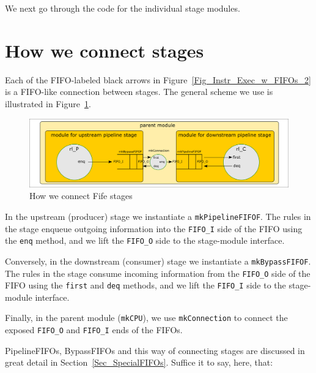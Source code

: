 We next go through the code for the individual stage modules.


\section{How we connect stages}

\label{Sec_Fife_connections}

Each of the FIFO-labeled black arrows in
Figure~\ref{Fig_Instr_Exec_w_FIFOs_2} is a FIFO-like connection
between stages.  The general scheme we use is illustrated in
Figure~\ref{Fig_Fife_connections}.
\begin{figure}[htbp]
  \centerline{\includegraphics[width=6in,angle=0]{Figures/Fig_Composed_FIFO_modularity}}
  \caption{\label{Fig_Fife_connections}
           How we connect Fife stages}
\end{figure}

In the upstream (producer) stage we instantiate a
\verb|mkPipelineFIFOF|.  The rules in the stage enqueue outgoing
information into the \verb|FIFO_I| side of the FIFO using the
\verb|enq| method, and we lift the \verb|FIFO_O| side to the
stage-module interface.

Conversely, in the downstream (consumer) stage we instantiate a
\verb|mkBypassFIFOF|.  The rules in the stage consume incoming
information from the \verb|FIFO_O| side of the FIFO using the
\verb|first| and \verb|deq| methods, and we lift the \verb|FIFO_I|
side to the stage-module interface.

Finally, in the parent module (\verb|mkCPU|), we use
\verb|mkConnection| to connect the exposed \verb|FIFO_O| and
\verb|FIFO_I| ends of the FIFOs.

PipelineFIFOs, BypassFIFOs and this way of connecting stages are
discussed in great detail in Section~\ref{Sec_SpecialFIFOs}.  Suffice
it to say, here, that:

